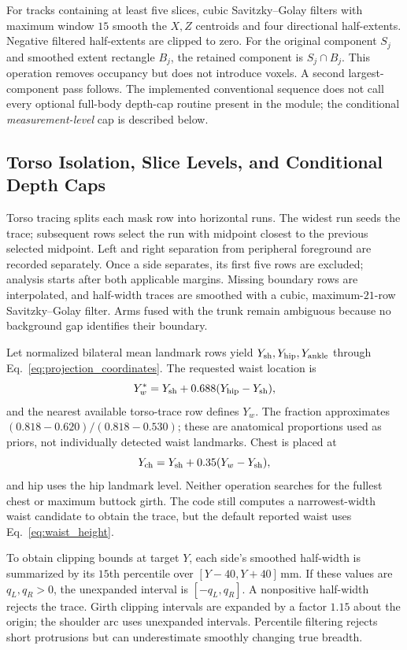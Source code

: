 \documentclass[journal]{IEEEtran}
\begin{document}
For tracks containing at least five slices, cubic Savitzky--Golay filters with maximum window $15$ smooth the $X,Z$ centroids and four directional half-extents. Negative filtered half-extents are clipped to zero. For the original component $S_j$ and smoothed extent rectangle $B_j$, the retained component is $S_j\cap B_j$. This operation removes occupancy but does not introduce voxels. A second largest-component pass follows. The implemented conventional sequence does not call every optional full-body depth-cap routine present in the module; the conditional \emph{measurement-level} cap is described below.

\subsection{Torso Isolation, Slice Levels, and Conditional Depth Caps}
\label{subsec:anatomical_levels}
Torso tracing splits each mask row into horizontal runs. The widest run seeds the trace; subsequent rows select the run with midpoint closest to the previous selected midpoint. Left and right separation from peripheral foreground are recorded separately. Once a side separates, its first five rows are excluded; analysis starts after both applicable margins. Missing boundary rows are interpolated, and half-width traces are smoothed with a cubic, maximum-$21$-row Savitzky--Golay filter. Arms fused with the trunk remain ambiguous because no background gap identifies their boundary.

Let normalized bilateral mean landmark rows yield $Y_{\rm sh},Y_{\rm hip},Y_{\rm ankle}$ through Eq.~\eqref{eq:projection_coordinates}. The requested waist location is
\begin{equation}
Y_w^*=Y_{\rm sh}+0.688(Y_{\rm hip}-Y_{\rm sh}),
\label{eq:waist_height}
\end{equation}
and the nearest available torso-trace row defines $Y_w$. The fraction approximates $(0.818-0.620)/(0.818-0.530)$; these are anatomical proportions used as priors, not individually detected waist landmarks. Chest is placed at
\begin{equation}
Y_{\rm ch}=Y_{\rm sh}+0.35(Y_w-Y_{\rm sh}),
\label{eq:chest_height}
\end{equation}
and hip uses the hip landmark level. Neither operation searches for the fullest chest or maximum buttock girth. The code still computes a narrowest-width waist candidate to obtain the trace, but the default reported waist uses Eq.~\eqref{eq:waist_height}.

To obtain clipping bounds at target $Y$, each side's smoothed half-width is summarized by its $15$th percentile over $[Y-40,Y+40]$\,mm. If these values are $q_L,q_R>0$, the unexpanded interval is $[-q_L,q_R]$. A nonpositive half-width rejects the trace. Girth clipping intervals are expanded by a factor $1.15$ about the origin; the shoulder arc uses unexpanded intervals. Percentile filtering rejects short protrusions but can underestimate smoothly changing true breadth.
\end{document}

